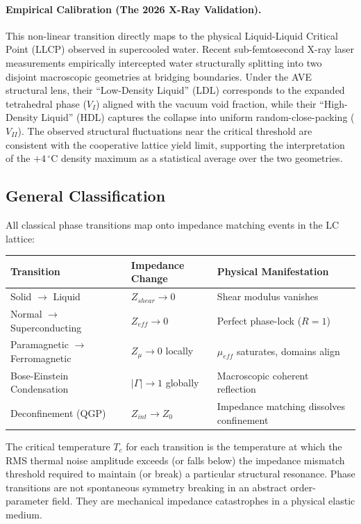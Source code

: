 \paragraph{Empirical Calibration (The 2026 X-Ray Validation).}
This non-linear transition directly maps to the physical Liquid-Liquid Critical Point (LLCP) observed in supercooled water. Recent sub-femtosecond X-ray laser measurements \cite{nilsson2026llcp} empirically intercepted water structurally splitting into two disjoint macroscopic geometries at bridging boundaries. Under the AVE structural lens, their ``Low-Density Liquid'' (LDL) corresponds to the expanded tetrahedral phase ($V_I$) aligned with the vacuum void fraction, while their ``High-Density Liquid'' (HDL) captures the collapse into uniform random-close-packing ($V_{II}$). The observed structural fluctuations near the critical threshold are consistent with the cooperative lattice yield limit, supporting the interpretation of the $+4\,^{\circ}\text{C}$ density maximum as a statistical average over the two geometries.

\subsection{General Classification}

All classical phase transitions map onto impedance matching events in the LC lattice:

\begin{center}
\renewcommand{\arraystretch}{1.3}
\begin{tabularx}{\textwidth}{@{}l l X@{}}
\toprule
\textbf{Transition} & \textbf{Impedance Change} & \textbf{Physical Manifestation} \\
\midrule
Solid $\to$ Liquid & $Z_{shear} \to 0$ & Shear modulus vanishes \\
Normal $\to$ Superconducting & $Z_{eff} \to 0$ & Perfect phase-lock ($R = 1$) \\
Paramagnetic $\to$ Ferromagnetic & $Z_\mu \to 0$ locally & $\mu_{eff}$ saturates, domains align \\
Bose-Einstein Condensation & $|\Gamma| \to 1$\gammaundeclared{} globally & Macroscopic coherent reflection \\
Deconfinement (QGP) & $Z_{int} \to Z_0$ & Impedance matching dissolves confinement \\
\bottomrule
\end{tabularx}
\end{center}

The critical temperature $T_c$ for each transition is the temperature at which the RMS thermal noise amplitude exceeds (or falls below) the impedance mismatch threshold required to maintain (or break) a particular structural resonance. Phase transitions are not spontaneous symmetry breaking in an abstract order-parameter field. They are mechanical impedance catastrophes in a physical elastic medium.

